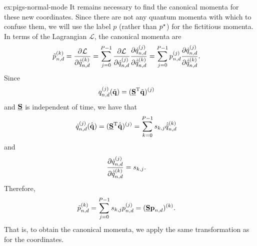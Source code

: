 \begin{DefAnswer}{ex:pigs-normal-mode}
	It remains necessary to find the canonical momenta for these new coordinates.
	Since there are not any quantum momenta with which to confuse them, we will use the label $p$ (rather than ${p}^\star$) for the fictitious momenta.
	In terms of the Lagrangian $\mathcal{L}$, the canonical momenta are~\cite[35]{evans2008statistical}
	\begin{align}
		\nm{p}_{n,d}\bead{k}
		&= \dpd{\mathcal{L}}{{\dot{\nm{q}}_{n,d}\bead{k}}}
		= \sum_{j=0}^{P-1} \frac{\partial \mathcal{L}}{\partial \dot{q}_{n,d}\bead{j}} \frac{\partial \dot{q}_{n,d}\bead{j}}{\partial \dot{\nm{q}}_{n,d}\bead{k}}
		= \sum_{j=0}^{P-1} p_{n,d}\bead{j} \frac{\partial \dot{q}_{n,d}\bead{j}}{\partial \dot{\nm{q}}_{n,d}\bead{k}}.
	\end{align}
	Since
	\begin{align}
		q_{n,d}^{(j)}(\tilde{\bm{\mathbf{q}}})
		&= (\underline{\bm{\mathbf{S}}}^\mathrm{T} \tilde{\bm{\mathbf{q}}})^{(j)}
	\end{align}
	and $\underline{\bm{\mathbf{S}}}$ is independent of time, we have that
	\begin{align}
		\dot{q}_{n,d}^{(j)}(\dot{\tilde{\bm{\mathbf{q}}}})
		&= (\underline{\bm{\mathbf{S}}}^\mathrm{T} \dot{\tilde{\bm{\mathbf{q}}}})^{(j)}
		= \sum_{k=0}^{P-1} s_{k,j} \dot{\tilde{q}}_{n,d}^{(k)}
	\end{align}
	and
	\begin{align}
		\frac{\partial \dot{q}_{n,d}^{(j)}}{\partial \dot{\tilde{q}}_{n,d}^{(k)}}
		&= s_{k,j}.
	\end{align}
	Therefore,
	\begin{align}
		\tilde{p}_{n,d}^{(k)}
		&= \sum_{j=0}^{P-1} s_{k,j} p_{n,d}^{(j)}
		= (\underline{\bm{\mathbf{S}}} \bm{\mathbf{p}}_{n,d})^{(k)}.
	\end{align}
	That is, to obtain the canonical momenta, we apply the same transformation as for the coordinates.
\end{DefAnswer}

